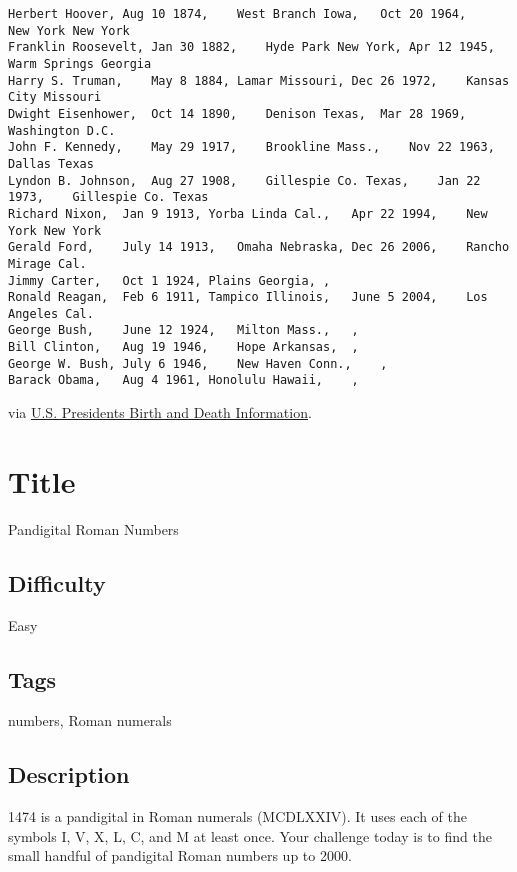 \begin{verbatim}
Herbert Hoover, Aug 10 1874,    West Branch Iowa,   Oct 20 1964,    New York New York
Franklin Roosevelt, Jan 30 1882,    Hyde Park New York, Apr 12 1945,    Warm Springs Georgia
Harry S. Truman,    May 8 1884, Lamar Missouri, Dec 26 1972,    Kansas City Missouri
Dwight Eisenhower,  Oct 14 1890,    Denison Texas,  Mar 28 1969,    Washington D.C.
John F. Kennedy,    May 29 1917,    Brookline Mass.,    Nov 22 1963,    Dallas Texas
Lyndon B. Johnson,  Aug 27 1908,    Gillespie Co. Texas,    Jan 22 1973,    Gillespie Co. Texas
Richard Nixon,  Jan 9 1913, Yorba Linda Cal.,   Apr 22 1994,    New York New York
Gerald Ford,    July 14 1913,   Omaha Nebraska, Dec 26 2006,    Rancho Mirage Cal.
Jimmy Carter,   Oct 1 1924, Plains Georgia, ,   
Ronald Reagan,  Feb 6 1911, Tampico Illinois,   June 5 2004,    Los Angeles Cal.
George Bush,    June 12 1924,   Milton Mass.,   ,   
Bill Clinton,   Aug 19 1946,    Hope Arkansas,  ,   
George W. Bush, July 6 1946,    New Haven Conn.,    ,   
Barack Obama,   Aug 4 1961, Honolulu Hawaii,    ,
\end{verbatim}

via \href{http://www.presidentsusa.net/birth.html}{U.S. Presidents Birth
and Death Information}.

\section{Title}\label{title-33}

Pandigital Roman Numbers

\subsection{Difficulty}\label{difficulty-32}

Easy

\subsection{Tags}\label{tags-33}

numbers, Roman numerals

\subsection{Description}\label{description-33}

1474 is a pandigital in Roman numerals (MCDLXXIV). It uses each of the
symbols I, V, X, L, C, and M at least once. Your challenge today is to
find the small handful of pandigital Roman numbers up to 2000.

